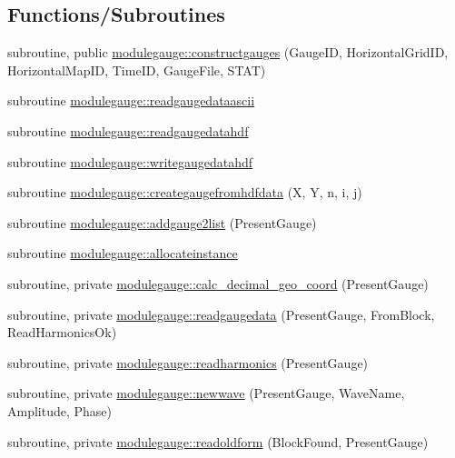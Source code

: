 \subsection*{Functions/\+Subroutines}
\begin{DoxyCompactItemize}
\item 
subroutine, public \mbox{\hyperlink{namespacemodulegauge_a5f441d56f4c693dc4323df1e0d702ea6}{modulegauge\+::constructgauges}} (Gauge\+ID, Horizontal\+Grid\+ID, Horizontal\+Map\+ID, Time\+ID, Gauge\+File, S\+T\+AT)
\item 
subroutine \mbox{\hyperlink{namespacemodulegauge_a6f6a7638c9e37ab7f5461866ec475f03}{modulegauge\+::readgaugedataascii}}
\item 
subroutine \mbox{\hyperlink{namespacemodulegauge_a26f00d7d5cd5edd1ce28da62855cb19f}{modulegauge\+::readgaugedatahdf}}
\item 
subroutine \mbox{\hyperlink{namespacemodulegauge_a473e631b98b7b3cb869f4ede62f77425}{modulegauge\+::writegaugedatahdf}}
\item 
subroutine \mbox{\hyperlink{namespacemodulegauge_a986286ef5f7c779896aa9d9797f840cd}{modulegauge\+::creategaugefromhdfdata}} (X, Y, n, i, j)
\item 
subroutine \mbox{\hyperlink{namespacemodulegauge_a672a5d3f45d4bf6b413012a0705ca328}{modulegauge\+::addgauge2list}} (Present\+Gauge)
\item 
subroutine \mbox{\hyperlink{namespacemodulegauge_a1aea609b0bda24026589e2d67bf3e0ab}{modulegauge\+::allocateinstance}}
\item 
subroutine, private \mbox{\hyperlink{namespacemodulegauge_adb09b4f645d53ae4da6e979cbda1d5ea}{modulegauge\+::calc\+\_\+decimal\+\_\+geo\+\_\+coord}} (Present\+Gauge)
\item 
subroutine, private \mbox{\hyperlink{namespacemodulegauge_a6be887d8098d9844b158ef75048c3473}{modulegauge\+::readgaugedata}} (Present\+Gauge, From\+Block, Read\+Harmonics\+Ok)
\item 
subroutine, private \mbox{\hyperlink{namespacemodulegauge_a9095cfa51e7b4150e1d3889efe30b265}{modulegauge\+::readharmonics}} (Present\+Gauge)
\item 
subroutine, private \mbox{\hyperlink{namespacemodulegauge_ad253767480082a0c9e00cc725e85786e}{modulegauge\+::newwave}} (Present\+Gauge, Wave\+Name, Amplitude, Phase)
\item 
subroutine, private \mbox{\hyperlink{namespacemodulegauge_a046651f5fe7a0df46688f6d3467b09b5}{modulegauge\+::readoldform}} (Block\+Found, Present\+Gauge)
\item 

\end{DoxyCompactItemize}
